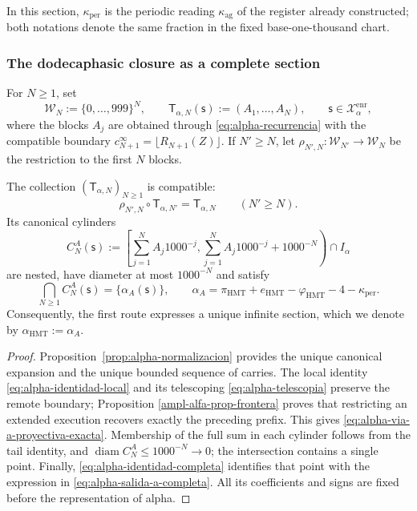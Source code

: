 In this section, \(\kappa_{\mathrm{per}}\) is the periodic reading \(\kappa_{\mathrm{ag}}\) of the register already constructed; both notations denote the same fraction in the fixed base-one-thousand chart.

\subsubsection{The dodecaphasic closure as a complete section}

For \(N\geq1\), set
\[
 \mathcal W_N:=\{0,\ldots,999\}^{N},
 \qquad
 \mathsf T_{\alpha,N}(\mathsf s):=(A_1,\ldots,A_N),
 \qquad \mathsf s\in\mathcal X_{\alpha}^{\mathrm{enr}},
\]
where the blocks \(A_j\) are obtained through
\eqref{eq:alpha-recurrencia} with the compatible boundary
\(c_{N+1}^{\infty}=\lfloor R_{N+1}(Z)\rfloor\). If \(N'\geq N\), let
\(\rho_{N',N}:\mathcal W_{N'}\to\mathcal W_N\) be the restriction to the
first \(N\) blocks.

\begin{theorem}
\label{thm:alpha-salida-dodecafasica-completa}
The collection \((\mathsf T_{\alpha,N})_{N\geq1}\) is compatible:
\begin{equation}
 \rho_{N',N}\circ\mathsf T_{\alpha,N'}
 =\mathsf T_{\alpha,N}
 \qquad(N'\geq N).
 \label{eq:alpha-via-a-proyectiva-exacta}
\end{equation}
Its canonical cylinders
\begin{equation}
 C_N^A(\mathsf s):=
 \left[
  \sum_{j=1}^{N}A_j1000^{-j},
  \sum_{j=1}^{N}A_j1000^{-j}+1000^{-N}
 \right)\cap I_\alpha
 \label{eq:alpha-cilindros-via-a-exactos}
\end{equation}
are nested, have diameter at most \(1000^{-N}\) and satisfy
\begin{equation}
 \bigcap_{N\geq1}C_N^A(\mathsf s)
 =\{\alpha_A(\mathsf s)\},
 \qquad
 \alpha_A
 =\pi_{\mathrm{HMT}}+e_{\mathrm{HMT}}-\varphi_{\mathrm{HMT}}
  -4-\kappa_{\mathrm{per}}.
 \label{eq:alpha-salida-a-completa}
\end{equation}
Consequently, the first route expresses a unique infinite section, which we
denote by \(\alpha_{\mathrm{HMT}}:=\alpha_A\).
\end{theorem}

\begin{proof}
Proposition~\ref{prop:alpha-normalizacion} provides the unique canonical
expansion and the unique bounded sequence of carries. The local identity
\eqref{eq:alpha-identidad-local} and its telescoping
\eqref{eq:alpha-telescopia} preserve the remote boundary; Proposition
\ref{ampl-alfa-prop-frontera} proves that restricting an extended execution
recovers exactly the preceding prefix. This gives
\eqref{eq:alpha-via-a-proyectiva-exacta}. Membership of the full sum
in each cylinder follows from the tail identity, and
\(\operatorname{diam}C_N^A\leq1000^{-N}\to0\); the intersection contains a
single point. Finally, \eqref{eq:alpha-identidad-completa} identifies that
point with the expression in \eqref{eq:alpha-salida-a-completa}. All its
coefficients and signs are fixed before the representation of alpha.
\end{proof}

